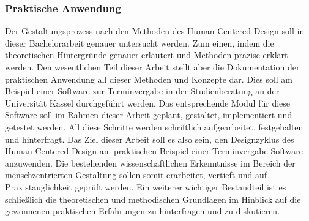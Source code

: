\subsubsection{Praktische Anwendung}
Der Gestaltungsprozess nach den Methoden des Human Centered Design soll in
dieser Bachelorarbeit genauer untersucht werden. Zum einen, indem die
theoretischen Hintergründe genauer erläutert und Methoden präzise erklärt
werden. Den wesentlichen Teil dieser Arbeit stellt aber die Dokumentation der
praktischen Anwendung all dieser Methoden und Konzepte dar. Dies soll am
Beispiel einer Software zur Terminvergabe in der Studienberatung an der
Universität Kassel durchgeführt werden. Das entsprechende Modul für diese
Software soll im Rahmen dieser Arbeit geplant, gestaltet, implementiert und
getestet werden. All diese Schritte werden schriftlich aufgearbeitet,
festgehalten und hinterfragt. Das Ziel dieser Arbeit soll es also sein, den
Designzyklus des Human Centered Design am praktischen Beispiel einer
Terminvergabe-Software anzuwenden. Die bestehenden wissenschaftlichen
Erkenntnisse im Bereich der menschzentrierten Gestaltung sollen somit
erarbeitet, vertieft und auf Praxistauglichkeit geprüft werden. Ein weiterer
wichtiger Bestandteil ist es schließlich die theoretischen und methodischen
Grundlagen im Hinblick auf die gewonnenen praktischen Erfahrungen zu
hinterfragen und zu diskutieren.

